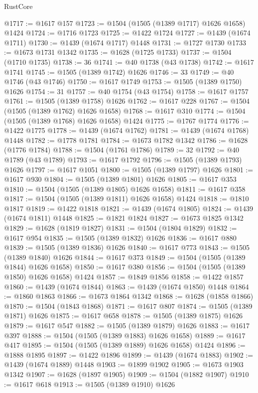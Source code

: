 \begin{lexlean}{RustCore}
\begin{coremodule}
@1717 := @1617 @157
@1723 := @1504 (@1505 (@1389 @1717) @1626 @1658) @1424
@1724 := @1716 @1723
@1725 := @1422 @1724
@1727 := @1439 (@1674 @1711)
@1730 := @1439 (@1674 @1717) @1448
@1731 := @1727 @1730
@1733 := @1673 @1731 @1342
@1735 := @1628 (@1725 @1733)
@1737 := @1504 (@1710 @1735)
@1738 := 36
@1741 := @40 @1738 (@43 @1738)
@1742 := @1617 @1741
@1745 := @1505 (@1389 @1742) @1626
@1746 := 33
@1749 := @40 @1746 (@43 @1746)
@1750 := @1617 @1749
@1753 := @1505 (@1389 @1750) @1626
@1754 := 31
@1757 := @40 @1754 (@43 @1754)
@1758 := @1617 @1757
@1761 := @1505 (@1389 @1758) @1626
@1762 := @1617 @228
@1767 := @1504 (@1505 (@1389 @1762) @1626 @1658)
@1768 := @1617 @310
@1774 := @1504 (@1505 (@1389 @1768) @1626 @1658) @1424
@1775 := @1767 @1774
@1776 := @1422 @1775
@1778 := @1439 (@1674 @1762)
@1781 := @1439 (@1674 @1768) @1448
@1782 := @1778 @1781
@1784 := @1673 @1782 @1342
@1786 := @1628 (@1776 @1784)
@1788 := @1504 (@1761 @1786)
@1789 := 32
@1792 := @40 @1789 (@43 @1789)
@1793 := @1617 @1792
@1796 := @1505 (@1389 @1793) @1626
@1797 := @1617 @1051
@1800 := @1505 (@1389 @1797) @1626
@1801 := @1617 @930
@1804 := @1505 (@1389 @1801) @1626
@1805 := @1617 @353
@1810 := @1504 (@1505 (@1389 @1805) @1626 @1658)
@1811 := @1617 @358
@1817 := @1504 (@1505 (@1389 @1811) @1626 @1658) @1424
@1818 := @1810 @1817
@1819 := @1422 @1818
@1821 := @1439 (@1674 @1805)
@1824 := @1439 (@1674 @1811) @1448
@1825 := @1821 @1824
@1827 := @1673 @1825 @1342
@1829 := @1628 (@1819 @1827)
@1831 := @1504 (@1804 @1829)
@1832 := @1617 @954
@1835 := @1505 (@1389 @1832) @1626
@1836 := @1617 @880
@1839 := @1505 (@1389 @1836) @1626
@1840 := @1617 @773
@1843 := @1505 (@1389 @1840) @1626
@1844 := @1617 @373
@1849 := @1504 (@1505 (@1389 @1844) @1626 @1658)
@1850 := @1617 @380
@1856 := @1504 (@1505 (@1389 @1850) @1626 @1658) @1424
@1857 := @1849 @1856
@1858 := @1422 @1857
@1860 := @1439 (@1674 @1844)
@1863 := @1439 (@1674 @1850) @1448
@1864 := @1860 @1863
@1866 := @1673 @1864 @1342
@1868 := @1628 (@1858 @1866)
@1870 := @1504 (@1843 @1868)
@1871 := @1617 @807
@1874 := @1505 (@1389 @1871) @1626
@1875 := @1617 @658
@1878 := @1505 (@1389 @1875) @1626
@1879 := @1617 @547
@1882 := @1505 (@1389 @1879) @1626
@1883 := @1617 @397
@1888 := @1504 (@1505 (@1389 @1883) @1626 @1658)
@1889 := @1617 @417
@1895 := @1504 (@1505 (@1389 @1889) @1626 @1658) @1424
@1896 := @1888 @1895
@1897 := @1422 @1896
@1899 := @1439 (@1674 @1883)
@1902 := @1439 (@1674 @1889) @1448
@1903 := @1899 @1902
@1905 := @1673 @1903 @1342
@1907 := @1628 (@1897 @1905)
@1909 := @1504 (@1882 @1907)
@1910 := @1617 @618
@1913 := @1505 (@1389 @1910) @1626

\end{coremodule}
\end{lexlean}
